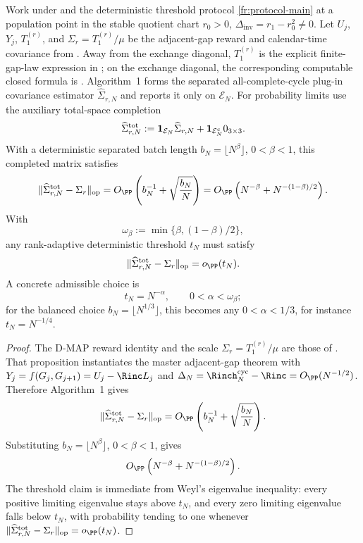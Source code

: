 \begin{proposition}\label{thm:finite-record-covariance-main}
Work under  and the deterministic
threshold protocol \ref{fr:protocol-main} at a population point in the stable
quotient chart \(r_0>0\), \(\Delta_{\mathrm{inv}}=r_1-r_0^2\ne0\).
Let \(U_j\), \(Y_j\), \(T_1^{(r)}\), and
\(\Sigma_r=T_1^{(r)}/\mu\) be the adjacent-gap reward and calendar-time
covariance from
.  Away from the
exchange diagonal, \(T_1^{(r)}\) is the explicit finite-gap-law expression
in ; on the
exchange diagonal, the corresponding computable closed formula is
.  Algorithm~1
forms the separated all-complete-cycle plug-in covariance estimator
\(\widehat\Sigma_{r,N}\) and reports it only on \(\mathcal E_N\).  For
probability limits use the auxiliary total-space completion
\[
\widehat\Sigma_{r,N}^{\rm tot}
:=\mathbf 1_{\mathcal E_N}\widehat\Sigma_{r,N}
+\mathbf 1_{\mathcal E_N^c}0_{3\times3}.
\]
With a deterministic separated batch length
\(b_N=\lfloor N^\beta\rfloor\), \(0<\beta<1\), this completed matrix satisfies
\[
\|\widehat\Sigma_{r,N}^{\rm tot}-\Sigma_r\|_{\operatorname{op}}
=
O_{\PP}\left(b_N^{-1}+\sqrt{\frac{b_N}{N}}\right)
=
O_{\PP}\left(N^{-\beta}+N^{-(1-\beta)/2}\right).
\]
With
\[
\omega_\beta:=\min\{\beta,(1-\beta)/2\},
\]
any rank-adaptive deterministic threshold \(t_N\) must satisfy
\[
\|\widehat\Sigma_{r,N}^{\rm tot}-\Sigma_r\|_{\operatorname{op}}
=o_{\PP}(t_N).
\]
A concrete admissible choice is
\[
t_N=N^{-\alpha},
\qquad
0<\alpha<\omega_\beta;
\]
for the balanced choice \(b_N=\lfloor N^{1/3}\rfloor\), this becomes any
\(0<\alpha<1/3\), for instance \(t_N=N^{-1/4}\).
\end{proposition}

\begin{proof}
The D-MAP reward identity and the scale
\(\Sigma_r=T_1^{(r)}/\mu\) are those of
.  That proposition
instantiates the master adjacent-gap theorem
 with
\(Y_j=f(G_j,G_{j+1})=U_j-\Rinc L_j\) and
\(\Delta_N=\Rinch_N^{\mathrm{cyc}}-\Rinc=O_{\PP}(N^{-1/2})\).  Therefore
Algorithm~1 gives
\[
\|\widehat\Sigma_{r,N}^{\rm tot}-\Sigma_r\|_{\operatorname{op}}
=O_{\PP}\left(b_N^{-1}+\sqrt{\frac{b_N}{N}}\right).
\]
Substituting \(b_N=\lfloor N^\beta\rfloor\), \(0<\beta<1\), gives
\[
O_{\PP}\left(N^{-\beta}+N^{-(1-\beta)/2}\right).
\]
The threshold claim is immediate from Weyl's eigenvalue inequality: every
positive limiting eigenvalue stays above \(t_N\), and every zero limiting
eigenvalue falls below \(t_N\), with probability tending to one whenever
\(\|\widehat\Sigma_{r,N}^{\rm tot}-\Sigma_r\|_{\operatorname{op}}
=o_{\PP}(t_N)\).
\end{proof}


